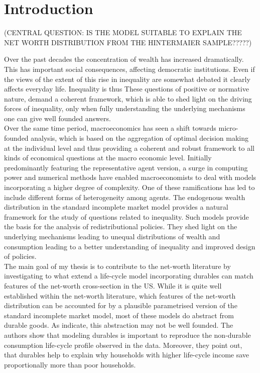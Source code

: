 \documentclass[a4paper,12pt,legno]{article}
\begin{document}
\listoffigures

 \newpage



\setcounter{page}{1}        %


\section{Introduction}
\label{Introduction}


(CENTRAL QUESTION: IS THE MODEL SUITABLE TO EXPLAIN THE NET WORTH DISTRIBUTION FROM THE HINTERMAIER SAMPLE?????) 

Over the past decades the concentration of wealth has increased dramatically. This has important social consequences, affecting democratic institutions. Even if the views of the extent of this rise in inequality are somewhat debated it clearly affects everyday life. Inequality is thus 
These questions of positive or normative nature, demand a coherent framework, which is able to shed light on the driving forces of inequality, only when fully understanding the underlying mechanisms one can give well founded answers.\\ 
Over the same time period, macroeconomics has seen a shift towards micro-founded analysis, which is based on the aggregation of optimal decision making at the individual level and thus providing a coherent and robust framework to all kinds of economical questions at the macro economic level. Initially predominantly featuring the representative agent version, a surge in computing power and numerical methods have enabled macroeconomists to deal with models incorporating a higher degree of complexity. One of these ramifications has led to include different forms of heterogeneity among agents. The endogenous wealth distribution in the standard incomplete market model provides a natural framework for the study of questions related to inequality. Such models provide the basis for the analysis of redistributional policies. They shed light on the underlying mechanisms leading to unequal distributions of wealth and consumption leading to a better understanding of inequality and improved design of policies. \\

The main goal of my thesis is to contribute to the net-worth literature by investigating to what extend a life-cycle model incorporating durables can match features of the net-worth cross-section in the US. While it is quite well established within the net-worth literature, which features of the net-worth distribution can be accounted for by a plausible parametrised version of the standard incomplete market model, most of these models do abstract from durable goods. As \cite{FV&K2011}  indicate, this abstraction may not be well founded. The authors show that modeling durables is important to reproduce the non-durable consumption life-cycle profile observed in the data. Moreover, they point out, that durables help to explain why households with higher life-cycle income save proportionally more than poor households.\\
\end{document}
